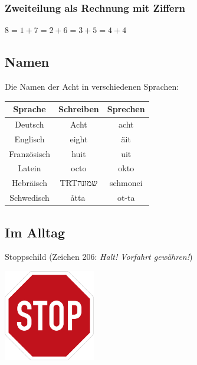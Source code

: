 \documentclass[a4paper]{amsart}
\newcommand{\texthebrew}[1]{\bgroup\textdir TRT\hebrewfont #1\egroup}
\theoremstyle{definition}
\begin{document}
\subsubsection{Zweiteilung als Rechnung mit Ziffern}
$8 = 1 + 7 = 2 + 6 = 3 + 5 = 4 + 4$

\subsection{Namen}
Die Namen der Acht in verschiedenen Sprachen:
\vspace{\kategoryVspace}

\begin{tabular}{|c|c|c|}
   \hline
   \textbf{Sprache}& \textbf{Schreiben} & \textbf{Sprechen} \\
   \hline
   Deutsch     &Acht   &acht      \\
   \hline
   Englisch    &eight  &äit       \\
   \hline
   Französisch &huit   &uit       \\
   \hline
   Latein      &octo   &okto      \\
   \hline
   Hebräisch   &\texthebrew{שמונה} &schmonei \\
   \hline
   Schwedisch  &åtta   &ot-ta     \\
   \hline
\end{tabular}

\subsection{Im Alltag}
Stoppschild (Zeichen 206: \emph{Halt! Vorfahrt gewähren!})

\includegraphics[height=4cm]{stoppSchild}
\end{document}
